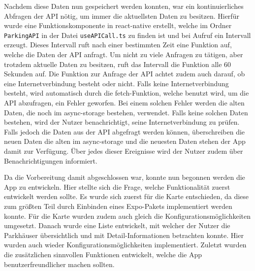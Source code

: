Nachdem diese Daten nun gespeichert werden konnten, war ein kontinuierliches Abfragen der API nötig, um immer die aktuellsten Daten zu besitzen. Hierfür wurde eine Funktionskomponente in react-native erstellt, welche im Ordner \verb|ParkingAPI| in der Datei \verb|useAPICall.ts| zu finden ist und bei Aufruf ein Intervall erzeugt. Dieses Intervall ruft nach einer bestimmten Zeit eine Funktion auf, welche die Daten der API anfragt. Um nicht zu viele Anfragen zu tätigen, aber trotzdem aktuelle Daten zu besitzen, ruft das Intervall die Funktion alle 60 Sekunden auf. Die Funktion zur Anfrage der API achtet zudem auch darauf, ob eine Internetverbindung besteht oder nicht. Falls keine Internetverbindung besteht, wird automatisch durch die fetch-Funktion, welche benutzt wird, um die API abzufragen, ein Fehler geworfen. Bei einem solchen Fehler werden die alten Daten, die noch im async-storage bestehen, verwendet. Falls keine solchen Daten bestehen, wird der Nutzer benachrichtigt, seine Internetverbindung zu prüfen. Falls jedoch die Daten aus der API abgefragt werden können, überschreiben die neuen Daten die alten im async-storage und die neuesten Daten stehen der App damit zur Verfügung. Über jedes dieser Ereignisse wird der Nutzer zudem über Benachrichtigungen informiert.

Da die Vorbereitung damit abgeschlossen war, konnte nun begonnen werden die App zu entwickeln. Hier stellte sich die Frage, welche Funktionalität zuerst entwickelt werden sollte. Es wurde sich zuerst für die Karte entschieden, da diese zum größten Teil durch Einbinden eines Expo-Pakets implementiert werden konnte. Für die Karte wurden zudem auch gleich die Konfigurationsmöglichkeiten umgesetzt. Danach wurde eine Liste entwickelt, mit welcher der Nutzer die Parkhäuser übersichtlich und mit Detail-Informationen betrachten konnte. Hier wurden auch wieder Konfigurationsmöglichkeiten implementiert. Zuletzt wurden die zusätzlichen sinnvollen Funktionen entwickelt, welche die App benutzerfreundlicher machen sollten.
%
%
